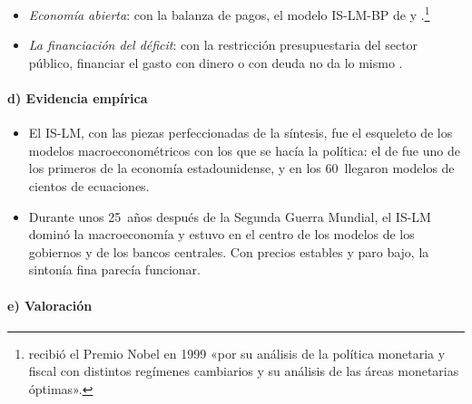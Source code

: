 \documentclass[11pt]{article}
\begin{document}
\begin{itemize}
\item \emph{Economía abierta}: con la balanza de pagos, el modelo IS-LM-BP de  y  .\footnote{ recibió el Premio Nobel en 1999 «por su análisis de la política monetaria y fiscal con distintos regímenes cambiarios y su análisis de las áreas monetarias óptimas»\nocite{Nobel1999Mundell}.}
\item \emph{La financiación del déficit}: con la restricción presupuestaria del sector público, financiar el gasto con dinero o con deuda no da lo mismo\nocite{BlinderSolow1973Analytical} .
\end{itemize}

\paragraph{d) Evidencia empírica}

\begin{itemize}
\item El IS-LM, con las piezas perfeccionadas de la síntesis, fue el esqueleto de los modelos macroeconométricos con los que se hacía la política: el de \textcite{KleinGoldberger1955Econometric} fue uno de los primeros de la economía estadounidense, y en los 60~llegaron modelos de cientos de ecuaciones.
\item Durante unos 25~años después de la Segunda Guerra Mundial, el IS-LM dominó la macroeconomía y estuvo en el centro de los modelos de los gobiernos y de los bancos centrales\nocite{DeVroeyHoover2004Introduction}. Con precios estables y paro bajo, la sintonía fina parecía funcionar.
\end{itemize}

\paragraph{e) Valoración}
\end{document}
